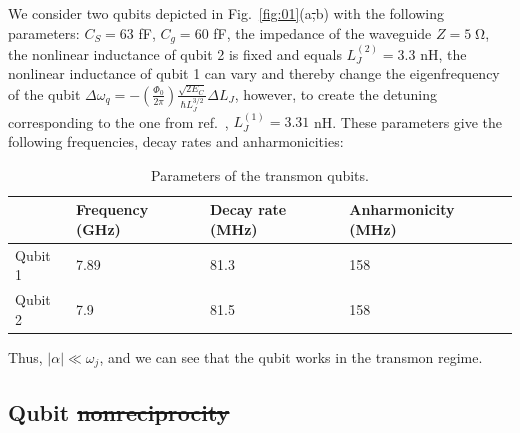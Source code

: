 \documentclass[lettersize,journal]{IEEEtran}
\providecommand{\DIFaddtex}[1]{{\protect\color{blue}\uwave{#1}}} %
\providecommand{\DIFdeltex}[1]{{\protect\color{red}\sout{#1}}}                      %
\providecommand{\DIFaddbegin}{} %
\providecommand{\DIFaddend}{} %
\providecommand{\DIFdelbegin}{} %
\providecommand{\DIFdelend}{} %
\providecommand{\DIFadd}[1]{\texorpdfstring{\DIFaddtex{#1}}{#1}} %
\providecommand{\DIFdel}[1]{\texorpdfstring{\DIFdeltex{#1}}{}} %
\newcommand{\DIFscaledelfig}{0.5}
\newlength{\DIFdelgraphicswidth} %
\newlength{\DIFdelgraphicsheight} %
\newcommand{\DIFaddincludegraphics}[2][]{{\color{blue}\fbox{\DIFOincludegraphics[#1]{#2}}}} %
\newcommand{\DIFdelincludegraphics}[2][]{%
\sbox{\DIFdelgraphicsbox}{\DIFOincludegraphics[#1]{#2}}%
\settoboxwidth{\DIFdelgraphicswidth}{\DIFdelgraphicsbox} %
\settoboxtotalheight{\DIFdelgraphicsheight}{\DIFdelgraphicsbox} %
\scalebox{\DIFscaledelfig}{%
\parbox[b]{\DIFdelgraphicswidth}{\usebox{\DIFdelgraphicsbox}\\[-\baselineskip] \rule{\DIFdelgraphicswidth}{0em}}\llap{\resizebox{\DIFdelgraphicswidth}{\DIFdelgraphicsheight}{%
\setlength{\unitlength}{\DIFdelgraphicswidth}%
\begin{picture}(1,1)%
\thicklines\linethickness{2pt} %
{\color[rgb]{1,0,0}\put(0,0){\framebox(1,1){}}}%
{\color[rgb]{1,0,0}\put(0,0){\line( 1,1){1}}}%
{\color[rgb]{1,0,0}\put(0,1){\line(1,-1){1}}}%
\end{picture}%
}\hspace*{3pt}}} %
} %
\DeclareRobustCommand{\DIFaddbegin}{\DIFOaddbegin \let\includegraphics\DIFaddincludegraphics} %
\DeclareRobustCommand{\DIFaddend}{\DIFOaddend \let\includegraphics\DIFOincludegraphics} %
\DeclareRobustCommand{\DIFdelbegin}{\DIFOdelbegin \let\includegraphics\DIFdelincludegraphics} %
\DeclareRobustCommand{\DIFdelend}{\DIFOaddend \let\includegraphics\DIFOincludegraphics} %
\begin{document}
\DIFaddend We consider two qubits depicted in Fig.~\ref{fig:01}(a\DIFdelbegin \DIFdel{,}\DIFdelend \DIFaddbegin \DIFadd{) and (}\DIFaddend b) with the following parameters: $C_S = 63$ fF, $C_g = 60$ fF, the impedance of the waveguide $Z = 5 \; \mathrm{\Omega}$, the nonlinear inductance of qubit 2 is fixed and equals $L_J^{(2)} = 3.3$ nH, the nonlinear inductance of qubit 1 can vary and thereby change the eigenfrequency of the qubit $\Delta \omega_q = - \left( \frac{\Phi_0}{2 \pi} \right) \frac{\sqrt{2 E_C}}{\hbar L_J^{3/2}} \Delta L_J$, however, to create the detuning corresponding to the one from ref.~\cite{rosario_hamann_nonreciprocity_2018}, $L_J^{(1)} = 3.31$ nH.
These parameters give the following frequencies, decay rates and anharmonicities:
\begin{table}[h!]
\centering
\caption{Parameters of the transmon qubits.}
\begin{tabular}{||m{1cm} m{1.6cm} m{1.6cm} m{1.6cm}||} 
 \hline
 & Frequency (GHz) & Decay rate (MHz) & Anharmonicity (MHz) \\
 \hline\hline
 Qubit 1 & 7.89 & 81.3 & 158 \\
 \hline
 Qubit 2 & 7.9 & 81.5 & 158 \\
 \hline
\end{tabular}
\label{tab:01}
\end{table}
Thus, $|\alpha| \ll \omega_j$, and we can see that the qubit works in the transmon regime.

\subsection{Qubit \DIFdelbegin \DIFdel{nonreciprocity}\DIFdelend \DIFaddbegin \DIFadd{Nonreciprocity}\DIFaddend }
\end{document}
